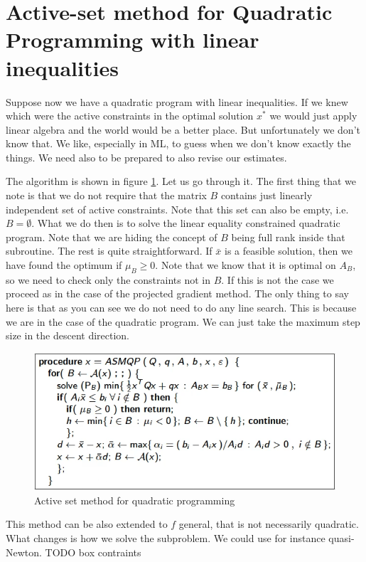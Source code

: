\section{Active-set method for Quadratic Programming with linear inequalities}
\par Suppose now we have a quadratic program with linear inequalities. If we knew which were the active constraints in the optimal solution $x^*$ we would just apply linear algebra and the world would be a better place. But unfortunately we don't know that. We like, especially in ML, to guess when we don't know exactly the things. We need also to be prepared to also revise our estimates.
\par The algorithm is shown in figure \ref{fig:chapter3-asmqp}. Let us go through it. The first thing that we note is that we do not require that the matrix $B$ contains just linearly independent set of active constraints. Note that this set can also be empty, i.e. $B = \emptyset$. What we do then is to solve the linear equality constrained quadratic program. Note that we are hiding the concept of $B$ being full rank inside that subroutine. The rest is quite straightforward. If $\bar{x}$ is a feasible solution, then we have found the optimum if $\mu_B \geq 0$. Note that we know that it is optimal on $A_B$, so we need to check only the constraints not in $B$. If this is not the case we proceed as in the case of the projected gradient method. The only thing to say here is that as you can see we do not need to do any line search. This is because we are in the case of the quadratic program. We can just take the maximum step size in the descent direction.
\begin{figure}
    \centering
    \includegraphics[scale=0.4]{figures/3/chapter3-asmqp.png}
    \caption{Active set method for quadratic programming}
    \label{fig:chapter3-asmqp}
\end{figure}
\par This method can be also extended to $f$ general, that is not necessarily quadratic. What changes is how we solve the subproblem. We could use for instance quasi-Newton.
TODO box contraints
%
%
%
